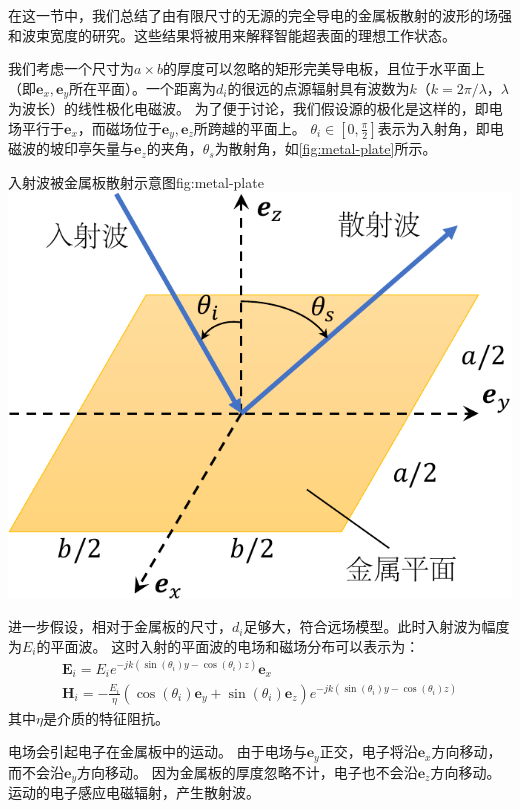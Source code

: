 \documentclass[supercite]{HustGraduPaper}
\begin{document}
在这一节中，我们总结了由有限尺寸的无源的完全导电的金属板散射的波形的场强和波束宽度的研究。这些结果将被用来解释智能超表面的理想工作状态。

我们考虑一个尺寸为$a \times b$的厚度可以忽略的矩形完美导电板，且位于水平面上（即$\boldsymbol{e}_{x}, \boldsymbol{e}_{y}$所在平面）。一个距离为$d_i$的很远的点源辐射具有波数为$k$（$k = 2\pi / \lambda$，$\lambda$为波长）的线性极化电磁波。
为了便于讨论，我们假设源的极化是这样的，即电场平行于$\boldsymbol{e}_{x}$，而磁场位于$\boldsymbol{e}_{y}, \boldsymbol{e}_{z}$所跨越的平面上。
$\theta_{i} \in\left[0, \frac{\pi}{2}\right]$表示为入射角，即电磁波的坡印亭矢量与$\boldsymbol{e}_{z}$的夹角，$\theta_{s}$为散射角，如\autoref{fig:metal-plate}所示。

\begin{generalfig}[htb]{入射波被金属板散射示意图}{fig:metal-plate}
	\includegraphics[width=0.5\linewidth]{Figures/metal-plate.pdf}
\end{generalfig}

进一步假设，相对于金属板的尺寸，$d_i$足够大，符合远场模型。此时入射波为幅度为$E_i$的平面波。
这时入射的平面波的电场和磁场分布可以表示为：
\begin{equation}
	\begin{array}{l}
		\mathbf{E}_{i}=E_{i} e^{-j k\left(\sin \left(\theta_{i}\right) y-\cos \left(\theta_{i}\right) z\right)} \boldsymbol{e}_{x} \\
		\mathbf{H}_{i}=-\frac{E_{i}}{\eta}\left(\cos \left(\theta_{i}\right) \boldsymbol{e}_{y}+\sin \left(\theta_{i}\right) \boldsymbol{e}_{z}\right) e^{-j k\left(\sin \left(\theta_{i}\right) y-\cos \left(\theta_{i}\right) z\right)}
	\end{array}
	\label{eq:e-field}
\end{equation}
其中$\eta$是介质的特征阻抗。

电场会引起电子在金属板中的运动。
由于电场与$\boldsymbol{e}_{y}$正交，电子将沿$\boldsymbol{e}_{x}$方向移动，而不会沿$\boldsymbol{e}_{y}$方向移动。
因为金属板的厚度忽略不计，电子也不会沿$\boldsymbol{e}_{z}$方向移动。
运动的电子感应电磁辐射，产生散射波。
\end{document}
